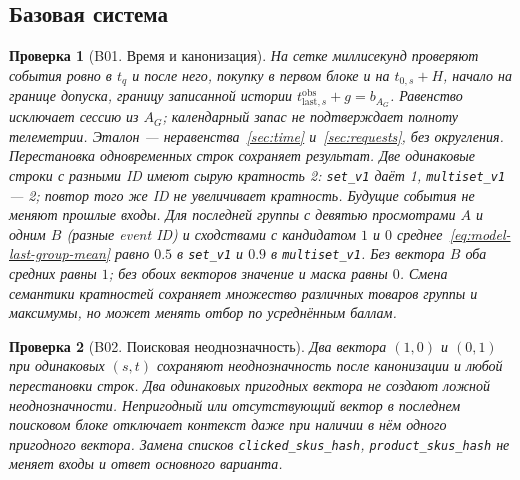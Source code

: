 \documentclass[12pt,a4paper]{article}
\newcommand{\code}[1]{{\ttfamily\small\nolinkurl{#1}}}
\theoremstyle{plainru}
\newtheorem{testcase}{Проверка}[section]
\begin{document}
\subsection{Базовая система}\label{app:tests-base}

\begin{testcase}[B01. Время и канонизация]
На сетке миллисекунд проверяют события ровно в $t_q$ и после него,
покупку в первом блоке и на $t_{0,s}+H$, начало на границе допуска,
границу записанной истории $t_{\mathrm{last},s}^{\mathrm{obs}}+g=b_{A_G}$.
Равенство исключает сессию из $A_G$; календарный запас не подтверждает
полноту телеметрии.
Эталон --- неравенства~\ref{sec:time} и~\ref{sec:requests}, без округления.
Перестановка одновременных строк сохраняет результат.
Две одинаковые строки с разными ID имеют сырую кратность 2:
\code{set_v1} даёт 1, \code{multiset_v1} --- 2; повтор того же ID
не увеличивает кратность. Будущие события не меняют прошлые входы.
Для последней группы с девятью просмотрами $A$ и одним $B$
(разные event ID) и сходствами с кандидатом $1$ и $0$
среднее~\eqref{eq:model-last-group-mean} равно $0.5$ в \code{set_v1}
и $0.9$ в \code{multiset_v1}. Без вектора $B$ оба средних равны $1$;
без обоих векторов значение и маска равны $0$.
Смена семантики кратностей сохраняет множество различных товаров
группы и максимумы, но может менять отбор по усреднённым баллам.
\end{testcase}

\begin{testcase}[B02. Поисковая неоднозначность]
Два вектора $(1,0)$ и $(0,1)$ при одинаковых $(s,t)$ сохраняют
неоднозначность после канонизации и любой перестановки строк.
Два одинаковых пригодных вектора не создают ложной неоднозначности.
Непригодный или отсутствующий вектор в последнем поисковом блоке
отключает контекст даже при наличии в нём одного пригодного вектора.
Замена списков \code{clicked_skus_hash}, \code{product_skus_hash}
не меняет входы и ответ основного варианта.
\end{testcase}
\end{document}
